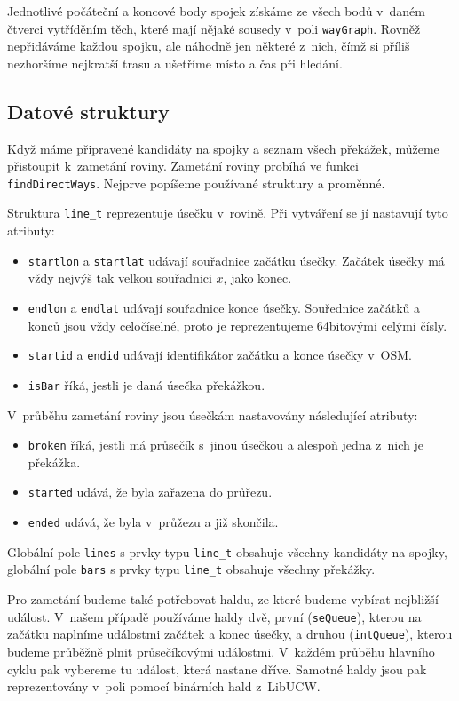 Jednotlivé počáteční a koncové body spojek získáme ze všech bodů v~daném čtverci
vytříděním těch, které mají nějaké sousedy v~poli \verb|wayGraph|. Rovněž
nepřidáváme každou spojku, ale náhodně jen některé z~nich, čímž si příliš
nezhoršíme nejkratší trasu a ušetříme místo a čas při hledání.

\subsection{Datové struktury}
Když máme připravené kandidáty na spojky a seznam všech překážek, můžeme
přistoupit k~zametání roviny. Zametání roviny probíhá ve funkci
\verb|findDirectWays|. Nejprve popíšeme používané struktury a proměnné.

Struktura \verb|line_t| reprezentuje úsečku v~rovině. Při vytváření se jí
nastavují tyto atributy:
\begin{itemize}
	\item \verb|startlon| a \verb|startlat| udávají souřadnice začátku
	úsečky. Začátek úsečky má vždy nejvýš tak velkou souřadnici $x$, jako
	konec.
	\item \verb|endlon| a \verb|endlat| udávají souřadnice konce úsečky.
	Souřednice začátků a konců jsou vždy celočíselné, proto je
	reprezentujeme 64bitovými celými čísly.
	\item \verb|startid| a \verb|endid| udávají identifikátor začátku a
	konce úsečky v~OSM.
	\item \verb|isBar| říká, jestli je daná úsečka překážkou.
\end{itemize}
V~průběhu zametání roviny jsou úsečkám nastavovány následující atributy:
\begin{itemize}
	\item \verb|broken| říká, jestli má průsečík s~jinou úsečkou a alespoň
	jedna z~nich je překážka.
	\item \verb|started| udává, že byla zařazena do průřezu.
	\item \verb|ended| udává, že byla v~průžezu a již skončila.
\end{itemize}

Globální pole \verb|lines| s prvky typu \verb|line_t| obsahuje všechny kandidáty
na spojky, globální pole \verb|bars| s prvky typu \verb|line_t| obsahuje všechny
překážky. 

Pro zametání budeme také potřebovat haldu, ze které budeme vybírat nejbližší
událost. V~našem případě používáme haldy dvě, první (\verb|seQueue|), kterou na
začátku naplníme událostmi začátek a konec úsečky, a druhou (\verb|intQueue|),
kterou budeme průběžně plnit průsečíkovými událostmi. V~každém průběhu hlavního
cyklu pak vybereme tu událost, která nastane dříve. Samotné haldy jsou pak
reprezentovány v~poli pomocí binárních hald z~LibUCW. 

